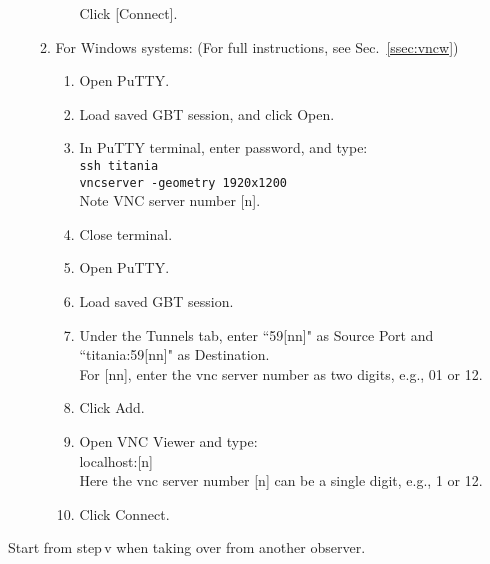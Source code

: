 \documentclass[11pt]{article}
\begin{document}
\begin{enumerate}
\begin{enumerate}
\begin{itemize}
   Click [Connect].
  \end{itemize}

  \item\label{st:win} %
  For Windows systems: (For full instructions, see Sec.~\ref{ssec:vncw})

  \begin{enumerate}
   \item Open PuTTY.
   \item Load saved GBT session, and click Open.
   \item In PuTTY terminal, enter password, and type: \\
   \texttt{ssh titania\\
   vncserver -geometry 1920x1200}\\
   Note VNC server number [n]. 
   \item Close terminal. 
   \item\label{st:op1} Open PuTTY.
   \item Load saved GBT session.
   \item Under the Tunnels tab, enter ``59[nn]" as Source Port and ``titania:59[nn]" as Destination. \\
   For [nn], enter the vnc server number as two digits, e.g., 01 or 12.
   \item Click Add.
   \item Open VNC Viewer and type:\\
   localhost:[n]\\
   Here the vnc server number [n] can be a single digit, e.g., 1 or 12. 
   \item Click Connect.
  \end{enumerate}
 \end{enumerate}
\end{enumerate}

  Start from step\,v when taking over from another observer.
\end{document}
